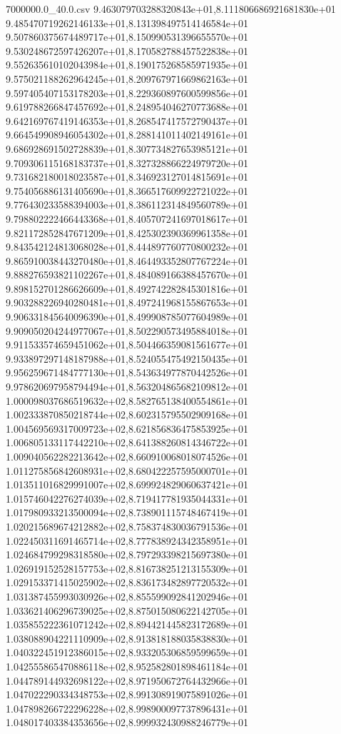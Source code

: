 \begin{filecontents*}{7000000.0_40.0.csv}
9.463079703288320843e+01,8.111806686921681830e+01
9.485470719262146133e+01,8.131398497514146584e+01
9.507860375674489717e+01,8.150990531396655570e+01
9.530248672597426207e+01,8.170582788457522838e+01
9.552635610102043984e+01,8.190175268585971935e+01
9.575021188262964245e+01,8.209767971669862163e+01
9.597405407153178203e+01,8.229360897600599856e+01
9.619788266847457692e+01,8.248954046270773688e+01
9.642169767419146353e+01,8.268547417572790437e+01
9.664549908946054302e+01,8.288141011402149161e+01
9.686928691502728839e+01,8.307734827653985121e+01
9.709306115168183737e+01,8.327328866224979720e+01
9.731682180018023587e+01,8.346923127014815691e+01
9.754056886131405690e+01,8.366517609922721022e+01
9.776430233588394003e+01,8.386112314849560789e+01
9.798802222466443368e+01,8.405707241697018617e+01
9.821172852847671209e+01,8.425302390369961358e+01
9.843542124813068028e+01,8.444897760770800232e+01
9.865910038443270480e+01,8.464493352807767224e+01
9.888276593821102267e+01,8.484089166388457670e+01
9.898152701286626609e+01,8.492742282845301816e+01
9.903288226940280481e+01,8.497241968155867653e+01
9.906331845640096390e+01,8.499908785077604989e+01
9.909050204244977067e+01,8.502290573495884018e+01
9.911533574659451062e+01,8.504466359081561677e+01
9.933897297148187988e+01,8.524055475492150435e+01
9.956259671484777130e+01,8.543634977870442526e+01
9.978620697958794494e+01,8.563204865682109812e+01
1.000098037686519632e+02,8.582765138400554861e+01
1.002333870850218744e+02,8.602315795502909168e+01
1.004569569317009723e+02,8.621856836475853925e+01
1.006805133117442210e+02,8.641388260814346722e+01
1.009040562282213642e+02,8.660910068018074526e+01
1.011275856842608931e+02,8.680422257595000701e+01
1.013511016829991007e+02,8.699924829060637421e+01
1.015746042276274039e+02,8.719417781935044331e+01
1.017980933213500094e+02,8.738901115748467419e+01
1.020215689674212882e+02,8.758374830036791536e+01
1.022450311691465714e+02,8.777838924342358951e+01
1.024684799298318580e+02,8.797293398215697380e+01
1.026919152528157753e+02,8.816738251213155309e+01
1.029153371415025902e+02,8.836173482897720532e+01
1.031387455993030926e+02,8.855599092841202946e+01
1.033621406296739025e+02,8.875015080622142705e+01
1.035855222361071242e+02,8.894421445823172689e+01
1.038088904221110909e+02,8.913818188035838830e+01
1.040322451912386015e+02,8.933205306859599659e+01
1.042555865470886118e+02,8.952582801898461184e+01
1.044789144932698122e+02,8.971950672764432966e+01
1.047022290334348753e+02,8.991308919075891026e+01
1.047898266722296228e+02,8.998900097737896431e+01
1.048017403384353656e+02,8.999932430988246779e+01

\end{filecontents*}
